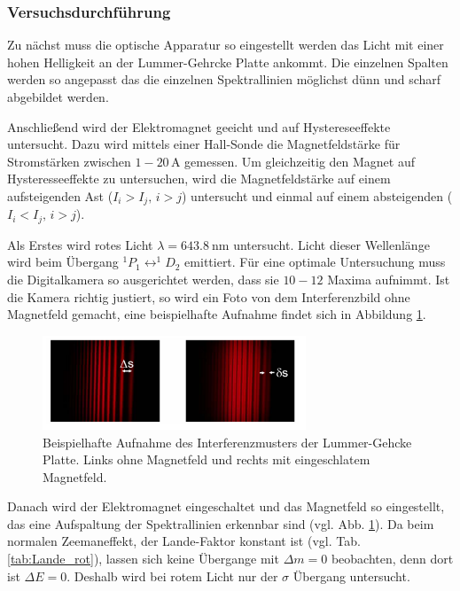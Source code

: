 \subsubsection{Versuchsdurchführung}
Zu nächst muss die optische Apparatur so eingestellt werden das Licht mit einer hohen Helligkeit %
an der Lummer-Gehrcke Platte ankommt. Die einzelnen Spalten werden so angepasst das die %
einzelnen Spektrallinien möglichst dünn und scharf abgebildet werden.

Anschließend wird der Elektromagnet geeicht und auf Hystereseeffekte untersucht.
Dazu wird mittels einer Hall-Sonde die Magnetfeldstärke für Stromstärken
zwischen $\num{1}-\num{20}\,\si{\ampere}$ gemessen. Um gleichzeitig den Magnet auf Hysteresseeffekte zu untersuchen,
wird die Magnetfeldstärke auf einem aufsteigenden Ast ($I_i>I_j,\, i>j$) untersucht und einmal auf einem absteigenden ($I_i<I_j,\, i>j$).

Als Erstes wird rotes Licht $\lambda = \SI{643.8}{\nano\meter}$ untersucht.
Licht dieser Wellenlänge wird beim Übergang $^1P_1\leftrightarrow ^1\!\!D_2$ emittiert.
Für eine optimale Untersuchung muss die Digitalkamera so ausgerichtet werden, dass sie $10-12$ Maxima aufnimmt.
Ist die Kamera richtig justiert, so wird ein Foto von dem Interferenzbild ohne Magnetfeld gemacht, eine beispielhafte Aufnahme
findet sich in Abbildung \ref{fig: bsp_foto}.
\FloatBarrier
\begin{figure}[h]
  \centering
  \includegraphics[width=0.7\textwidth]{pics/bsp_foto.png}
  \caption{Beispielhafte Aufnahme des Interferenzmusters der Lummer-Gehcke Platte. %
  Links ohne Magnetfeld und rechts mit eingeschlatem Magnetfeld\cite{anleitung27}.}
  \label{fig: bsp_foto}
\end{figure}
\FloatBarrier
Danach wird der Elektromagnet eingeschaltet und das Magnetfeld so eingestellt, das eine Aufspaltung der
Spektrallinien erkennbar sind (vgl. Abb. \ref{fig: bsp_foto}). Da beim normalen Zeemaneffekt, der Lande-Faktor konstant ist (vgl. Tab. \ref{tab:Lande_rot}), lassen sich keine %
Übergange mit $\Delta m=0$ beobachten, denn dort ist $\Delta E=0$. Deshalb wird bei rotem Licht nur %
der $\sigma$ Übergang untersucht.


